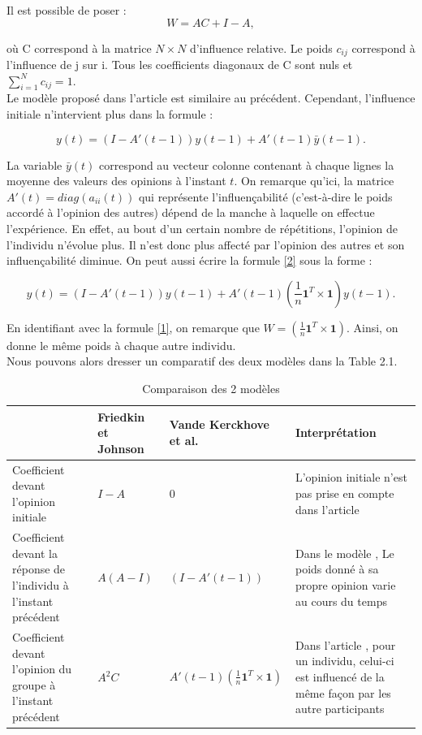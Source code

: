 \documentclass{scrreprt}
\begin{document}
 Il est possible de poser :\\
\begin{equation}
\label{WC}
 W=AC+I-A,
\end{equation}

\noindent où C correspond à la matrice $N \times N$ d'influence relative. Le poids $c_{ij}$ correspond à l'influence de j sur i. Tous les coefficients diagonaux de C sont nuls et $\sum_{i=1}^{N} c_{ij} = 1$. \\

Le modèle proposé dans l'article \cite{VMG} est similaire au précédent. Cependant, l’influence initiale n'intervient plus dans la formule :

\begin{equation}
\label{2}
y(t) =(I-A'(t-1))y(t-1)+A'(t-1)\bar{y}(t-1).
\end{equation}

La variable $\bar{y}(t)$ correspond au vecteur colonne contenant à chaque lignes la moyenne des valeurs des opinions à l'instant $t$. On remarque qu’ici, la matrice $A'(t) = diag(a_{ii}(t))$ qui représente l'influençabilité (c'est-à-dire le poids accordé à l'opinion des autres) dépend de la manche à laquelle on effectue l’expérience. En effet, au bout d'un certain nombre de répétitions, l'opinion de l'individu n'évolue plus. Il n'est donc plus affecté par l'opinion des autres et son influençabilité diminue. On peut aussi écrire la formule \eqref{2} sous la forme :

\begin{dmath}
\label{3}
y(t) = (I-A'(t-1))y(t-1) + A'(t-1)(\frac{1}{n} \textbf{1} ^T\times \textbf{1}) y(t-1).
\end{dmath}

En identifiant avec la formule \eqref{1}, on remarque que $W=(\frac{1}{n} \textbf{1} ^T\times \textbf{1})$. Ainsi, on donne le même poids à chaque autre individu.\\

Nous pouvons alors dresser un comparatif des deux modèles dans la Table 2.1.\\

  

\begin{table}
	\begin{tabular}{|p{3cm}|p{3.375cm}|p{3.375cm}|p{3.375cm}|}
		\hline
 & Friedkin et Johnson \cite{FJ} & Vande Kerckhove et al. \cite{VMG} & Interprétation \tabularnewline
		\hline
Coefficient devant l'opinion initiale & $I-A$ & $0$ & L'opinion initiale n'est pas prise en compte dans l'article \cite{VMG} \tabularnewline
		\hline
Coefficient devant la réponse de l'individu à l'instant précédent & $A(A-I)$ & $(I-A'(t-1))$ & Dans le modèle  \cite{VMG}, Le poids donné à sa propre opinion varie au cours du temps \tabularnewline
		\hline
Coefficient devant l'opinion du groupe à l'instant précédent & $A^{2}C$ & $A'(t-1)(\frac{1}{n} \textbf{1} ^T\times \textbf{1})$ & Dans l'article \cite{VMG}, pour un individu, celui-ci est influencé de la même façon par les autre participants \tabularnewline
		\hline
	\end{tabular}
	\caption{Comparaison des 2 modèles}
\end{table}
\end{document}
